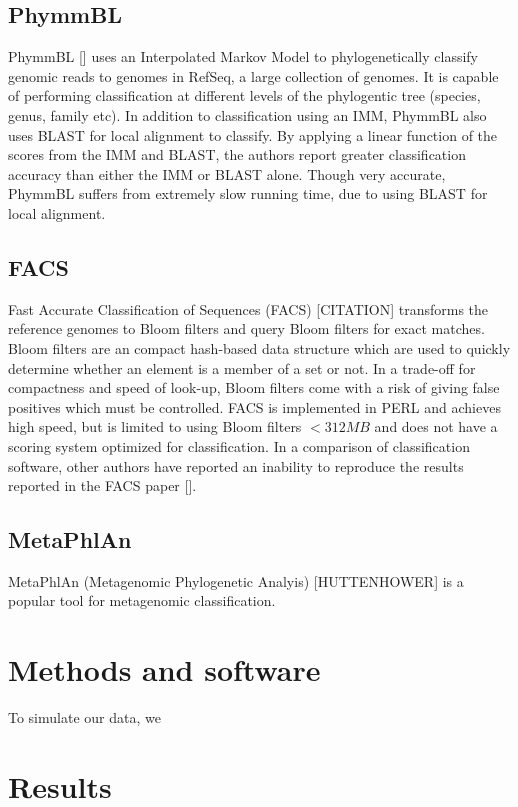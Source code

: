 \documentclass[12pt]{article} %
\begin{document}
\subsection{PhymmBL}
PhymmBL [\cite{Brady:2009dg}] uses an Interpolated Markov Model to phylogenetically classify genomic reads to genomes in RefSeq, a large collection of genomes. It is capable of performing classification at different levels of the phylogentic tree (species, genus, family etc). In addition to classification using an IMM, PhymmBL also uses BLAST for local alignment to classify. By applying a linear function of the scores from the IMM and BLAST, the authors report greater classification accuracy than either the IMM or BLAST alone. Though very accurate, PhymmBL suffers from extremely slow running time, due to using BLAST for local alignment. 

\subsection{FACS}
Fast Accurate Classification of Sequences (FACS) [CITATION] transforms the reference genomes to Bloom filters and query Bloom filters for exact matches. Bloom filters are an compact hash-based data structure which are used to quickly determine whether an element is a member of a set or not. In a trade-off for compactness and speed of look-up, Bloom filters come with a risk of giving false positives which must be controlled. FACS is implemented in PERL and achieves high speed, but is limited to using Bloom filters $<312 MB$ and does not have a scoring system optimized for classification. In a comparison of classification software, other authors have reported an inability to reproduce the results reported in the FACS paper [\cite{Bazinet:2012dg}].

\subsection{MetaPhlAn}
MetaPhlAn (Metagenomic Phylogenetic Analyis) [HUTTENHOWER] is a popular tool for metagenomic classification. 

\section{Methods and software}
To simulate our data, we
\section{Results}
\end{document}
